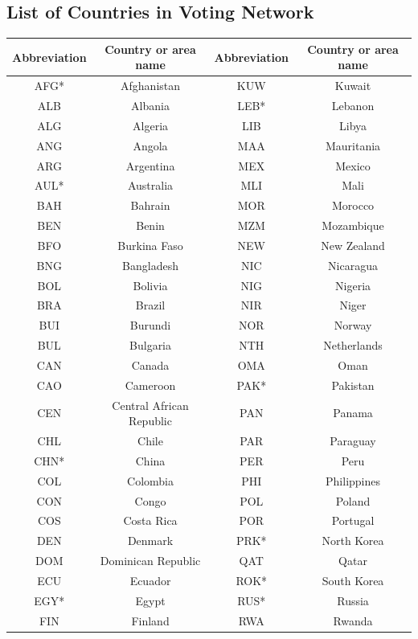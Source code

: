 \documentclass[a4paper]{article}
\begin{document}
\begin{appendices}
\section{List of Countries in Voting Network}\label{appendix: countrylist}
\begin{table}[H]
	\centering
\begin{tabular}{c|c||c|c}
	\hline
	Abbreviation&Country or area name &	Abbreviation&Country or area name\\
	\hline
			AFG* & Afghanistan & 	KUW & Kuwait\\
				ALB & Albania & LEB* & Lebanon\\
			ALG & Algeria & LIB &Libya \\
		ANG & Angola 	& MAA&  Mauritania\\
		ARG& Argentina	&MEX &Mexico \\
		AUL* & Australia&MLI&Mali\\
		BAH & Bahrain	&MOR & Morocco\\
	BEN & Benin 	&MZM & Mozambique\\
			BFO & Burkina Faso 	&NEW & New Zealand \\
	BNG&  Bangladesh	& NIC& Nicaragua\\
			BOL& Bolivia	& NIG &      Nigeria\\
		BRA &Brazil&NIR & Niger\\
				BUI & Burundi &NOR &Norway \\
		BUL & Bulgaria	&NTH &  Netherlands\\
		CAN & Canada	& OMA & Oman\\
		CAO & Cameroon	&PAK* & Pakistan\\
		CEN & Central African Republic	&PAN & Panama\\
			CHL & Chile &PAR & Paraguay\\
			CHN* & China	& PER & Peru \\
		COL & Colombia	&PHI & Philippines\\
			CON & Congo		&POL & Poland\\
			COS & Costa Rica&POR & Portugal\\
			DEN& Denmark	 & PRK* & North Korea\\
			DOM & Dominican Republic	&QAT & Qatar\\
		ECU &Ecuador 	&ROK* & South Korea\\
			EGY* & Egypt	&RUS* & Russia\\
				FIN & Finland	&RWA & Rwanda\\

\end{tabular}
\end{table}
\end{appendices}
\end{document}
